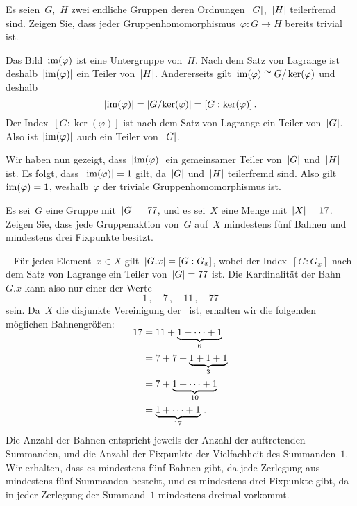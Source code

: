 \documentclass{scrartcl}
\begin{document}
\begin{exercise}
  Es seien~$G$,~$H$ zwei endliche Gruppen deren Ordnungen~$\lvert G\rvert$,~$\lvert H\rvert$ teilerfremd sind.
  Zeigen Sie, dass jeder Gruppenhomomorphismus~$\varphi \colon G \to H$ bereits trivial ist.
\end{exercise}

\begin{solution}
  Das Bild~$\operatorname{im}(\varphi)$ ist eine Untergruppe von~$H$.
  Nach dem Satz von Lagrange ist deshalb~$\lvert\operatorname{im}(\varphi)\rvert$ ein Teiler von~$\lvert H\rvert$.
  Andererseits gilt~$\operatorname{im}(\varphi) \cong G / \ker(\varphi)$ und deshalb
  \[
    \lvert \operatorname{im}(\varphi) \rvert
    =
    \lvert G / {\ker(\varphi)} \rvert
    =
    [G : \ker(\varphi)] \,.
  \]
  Der Index~$[G : \ker(\varphi)]$ ist nach dem Satz von Lagrange ein Teiler von~$\lvert G\rvert$.
  Also ist~$\lvert \operatorname{im}(\varphi) \rvert$ auch ein Teiler von~$\lvert G\rvert$.

  Wir haben nun gezeigt, dass~$\lvert \operatorname{im}(\varphi) \rvert$ ein gemeinsamer Teiler von~$\lvert G\rvert$ und~$\lvert H\rvert$ ist.
  Es folgt, dass~$\lvert \operatorname{im}(\varphi) \rvert = 1$ gilt, da~$\lvert G\rvert$ und~$\lvert H\rvert$ teilerfremd sind.
  Also gilt~$\operatorname{im}(\varphi) = 1$, weshalb~$\varphi$ der triviale Gruppenhomomorphismus ist.
\end{solution}

\begin{exercise}
  Es sei~$G$ eine Gruppe mit~$\lvert G\rvert = 77$, und es sei~$X$ eine Menge mit~$\lvert X\rvert = 17$.
  Zeigen Sie, dass jede Gruppenaktion von~$G$ auf~$X$ mindestens fünf Bahnen und mindestens drei Fixpunkte besitzt.
\end{exercise}

\begin{solution}~
  Für jedes Element~$x \in X$ gilt~$\lvert G.x\rvert = [G : G_x]$, wobei der Index~$[G : G_x]$ nach dem Satz von Lagrange ein Teiler von~$\lvert G\rvert = 77$ ist.
  Die Kardinalität der Bahn~$G.x$ kann also nur einer der Werte
  \[
    1 \,,
    \quad
    7 \,,
    \quad
    11 \,,
    \quad
    77
  \]
  sein.
  Da~$X$ die disjunkte Vereinigung der~ ist, erhalten wir die folgenden möglichen Bahnengrößen:
  \begin{align*}
    \SwapAboveDisplaySkip
    17
    &=
    11 + \underbrace{1 + \dotsb + 1}_{6}
    \\
    &=
    7 + 7 + \underbrace{ 1 + 1 + 1 }_{3}
    \\
    &=
    7 + \underbrace{1 + \dotsb + 1}_{10}
    \\
    &=
    \underbrace{1 + \dotsb + 1}_{17} \,.
  \end{align*}
  Die Anzahl der Bahnen entspricht jeweils der Anzahl der auftretenden Summanden, und die Anzahl der Fixpunkte der Vielfachheit des Summanden~$1$.
  Wir erhalten, dass es mindestens fünf Bahnen gibt, da jede Zerlegung aus mindestens fünf Summanden besteht, und es mindestens drei Fixpunkte gibt, da in jeder Zerlegung der Summand~$1$ mindestens dreimal vorkommt.
\end{solution}
\end{document}
